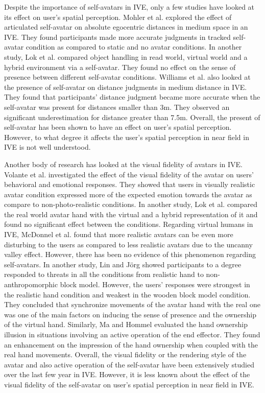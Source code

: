 Despite the importance of self-avatars in IVE, only a few studies have looked at its effect on user's spatial perception. Mohler et al. \cite{MCW+10} explored the effect of articulated self-avatar on absolute egocentric distances in medium space in an IVE. They found participants made more accurate judgments in tracked self-avatar condition as compared to static and no avatar conditions. In another study, Lok et al. \cite{LNW+03} compared object handling in read world, virtual world and a hybrid environment via a self-avatar. They found no effect on the sense of presence between different self-avatar conditions. Williams et al. \cite{WJS+08} also looked at the presence of self-avatar on distance judgments in medium distance in IVE. They found that participants' distance judgment became more accurate when the self-avatar was present for distances smaller than 3m. They observed an significant underestimation for distance greater than 7.5m. Overall, the present of self-avatar has been shown to have an effect on user's spatial perception. However, to what degree it affects the user's spatial perception in near field in IVE is not well understood.
 
Another body of research has looked at the visual fidelity of avatars in IVE. Volante et al. \cite{VBC+16} investigated the effect of the visual fidelity of the avatar on users' behavioral and emotional responses. They showed that users in visually realistic avatar condition expressed more of the expected emotion towards the avatar as compare to non-photo-realistic conditions. In another study, Lok et al. \cite{LNW+03} compared the real world avatar hand with the virtual and a hybrid representation of it and found no significant effect between the conditions. Regarding virtual humans in IVE, McDonnel et al. \cite{MBB12} found that more realistic avatars can be even more disturbing to the users as compared to less realistic avatars due to the uncanny valley effect. However, there has been no evidence of this phenomenon regarding self-avatars. In another study, Lin and J{\"o}rg \cite{LJ16} showed participants to a degree responded to threats in all the conditions from realistic hand to non-anthropomorphic block model. However, the users' responses were strongest in the realistic hand condition and weakest in the wooden block model condition. They concluded that synchronize movements of the avatar hand with the real one was one of the main factors on inducing the sense of presence and the ownership of the virtual hand. Similarly, Ma and Hommel \cite{MH15} evaluated the hand ownership illusion in situations involving an active operation of the end effector. They found an enhancement on the impression of the hand ownership when coupled with the real hand movements. Overall, the visual fidelity or the rendering style of the avatar and also active operation of the self-avatar have been extensively studied over the last few year in IVE. However, it is less known about the effect of the visual fidelity of the self-avatar on user's spatial perception in near field in IVE.


